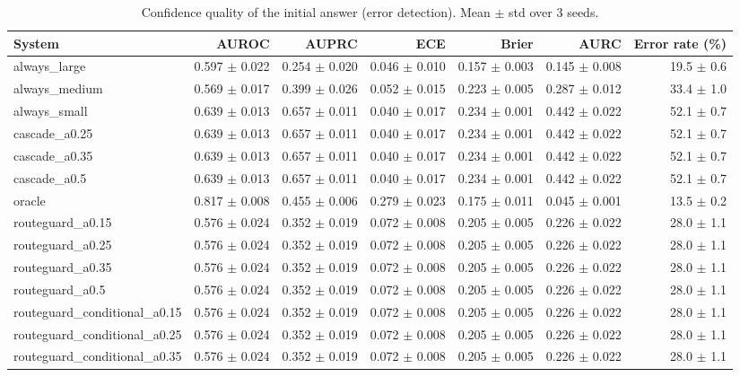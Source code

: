 \begin{table}[t]
\centering
\small
\caption{Confidence quality of the initial answer (error detection). Mean $\pm$ std over 3 seeds.}
\label{tab:calibration}
\begin{tabular}{lrrrrrr}
\toprule
System & AUROC & AUPRC & ECE & Brier & AURC & Error rate (\%) \\
\midrule
always\_large & 0.597 $\pm$ 0.022 & 0.254 $\pm$ 0.020 & 0.046 $\pm$ 0.010 & 0.157 $\pm$ 0.003 & 0.145 $\pm$ 0.008 & 19.5 $\pm$ 0.6 \\
always\_medium & 0.569 $\pm$ 0.017 & 0.399 $\pm$ 0.026 & 0.052 $\pm$ 0.015 & 0.223 $\pm$ 0.005 & 0.287 $\pm$ 0.012 & 33.4 $\pm$ 1.0 \\
always\_small & 0.639 $\pm$ 0.013 & 0.657 $\pm$ 0.011 & 0.040 $\pm$ 0.017 & 0.234 $\pm$ 0.001 & 0.442 $\pm$ 0.022 & 52.1 $\pm$ 0.7 \\
cascade\_a0.25 & 0.639 $\pm$ 0.013 & 0.657 $\pm$ 0.011 & 0.040 $\pm$ 0.017 & 0.234 $\pm$ 0.001 & 0.442 $\pm$ 0.022 & 52.1 $\pm$ 0.7 \\
cascade\_a0.35 & 0.639 $\pm$ 0.013 & 0.657 $\pm$ 0.011 & 0.040 $\pm$ 0.017 & 0.234 $\pm$ 0.001 & 0.442 $\pm$ 0.022 & 52.1 $\pm$ 0.7 \\
cascade\_a0.5 & 0.639 $\pm$ 0.013 & 0.657 $\pm$ 0.011 & 0.040 $\pm$ 0.017 & 0.234 $\pm$ 0.001 & 0.442 $\pm$ 0.022 & 52.1 $\pm$ 0.7 \\
oracle & 0.817 $\pm$ 0.008 & 0.455 $\pm$ 0.006 & 0.279 $\pm$ 0.023 & 0.175 $\pm$ 0.011 & 0.045 $\pm$ 0.001 & 13.5 $\pm$ 0.2 \\
routeguard\_a0.15 & 0.576 $\pm$ 0.024 & 0.352 $\pm$ 0.019 & 0.072 $\pm$ 0.008 & 0.205 $\pm$ 0.005 & 0.226 $\pm$ 0.022 & 28.0 $\pm$ 1.1 \\
routeguard\_a0.25 & 0.576 $\pm$ 0.024 & 0.352 $\pm$ 0.019 & 0.072 $\pm$ 0.008 & 0.205 $\pm$ 0.005 & 0.226 $\pm$ 0.022 & 28.0 $\pm$ 1.1 \\
routeguard\_a0.35 & 0.576 $\pm$ 0.024 & 0.352 $\pm$ 0.019 & 0.072 $\pm$ 0.008 & 0.205 $\pm$ 0.005 & 0.226 $\pm$ 0.022 & 28.0 $\pm$ 1.1 \\
routeguard\_a0.5 & 0.576 $\pm$ 0.024 & 0.352 $\pm$ 0.019 & 0.072 $\pm$ 0.008 & 0.205 $\pm$ 0.005 & 0.226 $\pm$ 0.022 & 28.0 $\pm$ 1.1 \\
routeguard\_conditional\_a0.15 & 0.576 $\pm$ 0.024 & 0.352 $\pm$ 0.019 & 0.072 $\pm$ 0.008 & 0.205 $\pm$ 0.005 & 0.226 $\pm$ 0.022 & 28.0 $\pm$ 1.1 \\
routeguard\_conditional\_a0.25 & 0.576 $\pm$ 0.024 & 0.352 $\pm$ 0.019 & 0.072 $\pm$ 0.008 & 0.205 $\pm$ 0.005 & 0.226 $\pm$ 0.022 & 28.0 $\pm$ 1.1 \\
routeguard\_conditional\_a0.35 & 0.576 $\pm$ 0.024 & 0.352 $\pm$ 0.019 & 0.072 $\pm$ 0.008 & 0.205 $\pm$ 0.005 & 0.226 $\pm$ 0.022 & 28.0 $\pm$ 1.1 \\
\bottomrule
\end{tabular}
\end{table}

